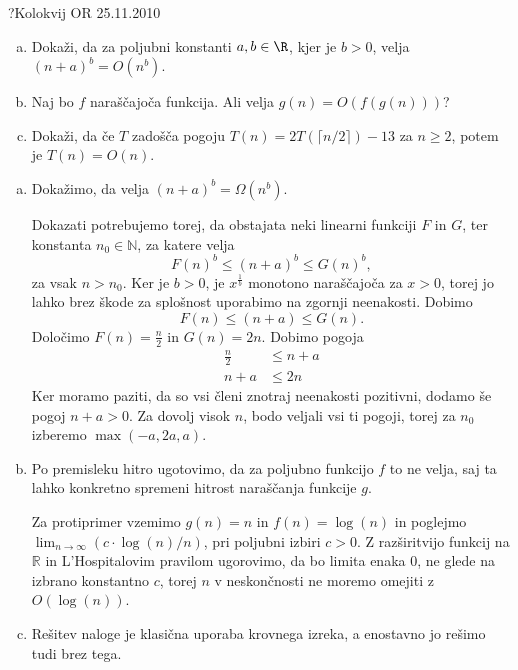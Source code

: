 \begin{naloga}{?}{Kolokvij OR 25.11.2010}
\begin{vprasanje}
\begin{enumerate}[(a)]
\item Dokaži, da za poljubni konstanti $a, b \in \R$, kjer je $b > 0$,
velja ${(n + a)}^b = O(n^b)$.

\item Naj bo $f$ naraščajoča funkcija.
Ali velja $g(n) = O(f(g(n)))$?

\item Dokaži,
da če $T$ zadošča pogoju $T(n) = 2T(\lceil n/2 \rceil) - 13$ za $n \ge 2$,
potem je $T(n) = O(n)$.
\end{enumerate}
\end{vprasanje}

\begin{odgovor}
\begin{enumerate}[(a)]
\item Dokažimo, da velja $(n + a)^b = \Omega(n^b)$.

Dokazati potrebujemo torej, da obstajata neki linearni funkciji $F$ in $G$, ter konstanta $n_0 \in \mathbb{N}$,
za katere velja $$F(n)^b \leq (n + a)^b \leq G(n)^b,$$ za vsak $n > n_0$.
Ker  je $b > 0$, je $x^{\frac{1}{b}}$ monotono naraščajoča za $x>0$,
torej jo lahko brez škode za splošnost uporabimo na zgornji neenakosti.
Dobimo $$F(n) \leq (n + a) \leq G(n).$$
Določimo $F(n) = \frac{n}{2}$ in $G(n) = 2n$.
Dobimo pogoja
\begin{align*}
\frac{n}{2} &\leq n + a \\
n + a &\leq 2n
\end{align*}
Ker moramo paziti, da so vsi členi znotraj neenakosti pozitivni, dodamo še pogoj $n + a > 0$.
Za dovolj visok $n$, bodo veljali vsi ti pogoji, torej za $n_0$ izberemo $\max(-a, 2a, a)$.

\item Po premisleku hitro ugotovimo, da za poljubno funkcijo $f$ to ne velja,
saj ta lahko konkretno spremeni hitrost naraščanja funkcije $g$.

Za protiprimer vzemimo $g(n) = n$ in $f(n) = \log(n)$ in poglejmo 
$\lim_{n \rightarrow \infty} (c \cdot \log(n) / n)$, pri poljubni izbiri $c > 0$.
Z razširitvijo funkcij na $\mathbb{R}$ in L'Hospitalovim pravilom ugorovimo, 
da bo limita enaka 0, ne glede na izbrano konstantno $c$, 
torej $n$ v neskončnosti ne moremo omejiti z $O(\log(n))$.

\item Rešitev naloge je klasična uporaba krovnega izreka, a enostavno jo rešimo tudi brez tega.


\end{enumerate}
\end{odgovor}
\end{naloga}
